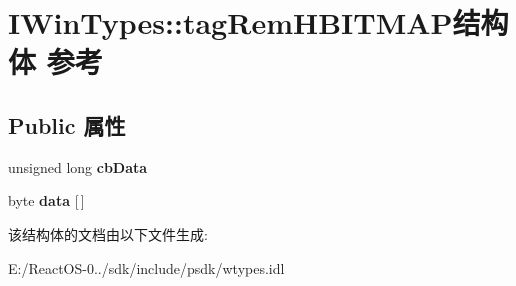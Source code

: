 \hypertarget{struct_i_win_types_1_1tag_rem_h_b_i_t_m_a_p}{}\section{I\+Win\+Types\+:\+:tag\+Rem\+H\+B\+I\+T\+M\+A\+P结构体 参考}
\label{struct_i_win_types_1_1tag_rem_h_b_i_t_m_a_p}
\subsection*{Public 属性}
\begin{DoxyCompactItemize}
\item 
\mbox{\label{struct_i_win_types_1_1tag_rem_h_b_i_t_m_a_p_a38e0e211e3da77c5419c0957a3c5bc78}} 
unsigned long {\bfseries cb\+Data}
\item 
\mbox{\label{struct_i_win_types_1_1tag_rem_h_b_i_t_m_a_p_abcbba0a20c9c3ea6a455439f37a8d2b3}} 
byte {\bfseries data} \mbox{[}$\,$\mbox{]}
\end{DoxyCompactItemize}


该结构体的文档由以下文件生成\+:\begin{DoxyCompactItemize}
\item 
E\+:/\+React\+O\+S-\/0../sdk/include/psdk/wtypes.\+idl\end{DoxyCompactItemize}
